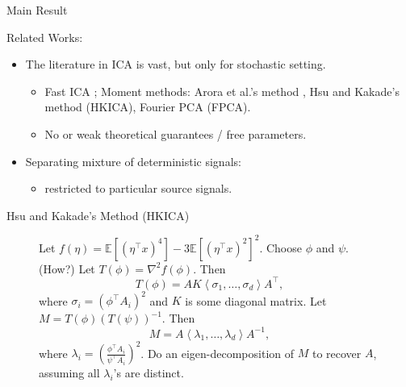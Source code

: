 \documentclass[final]{beamer} %
\newcommand{\EEp}[1]{\mathbb{E}\left[#1\right]}
\begin{document}
\begin{frame}[c]
\begin{columns}[t,totalwidth=\textwidth]
\begin{column}{.32\textwidth}
\begin{block}{Main Result}
\begin{center}
\begin{tcolorbox}[title = \vspace{0.4cm}\textbf{\large Main Result} \vspace{0.4cm}, title filled, width = 0.95\textwidth, colback = uofagreen!10, colframe = red]
				\end{tcolorbox}
			\end{center}
				{\large Related Works:}
			\begin{itemize}
						\item The literature in ICA is vast, but only for stochastic setting.
						\begin{itemize}
							\item Fast ICA \citep{hyvarinen1999fast}; Moment methods:
							Arora et al.'s method \citep{arora2012provable},
							Hsu and Kakade's method \citep{hsu2013learning} (HKICA), 
							Fourier PCA \citep{goyal2014fourier} (FPCA).	
							\item No or weak theoretical guarantees / free parameters.
						\end{itemize}
						\item Separating mixture of deterministic signals: \citet{kirimoto2011separation,forootan2013separation}
						\begin{itemize}
						\item restricted to particular source signals.
						\end{itemize}
					\end{itemize}
		\bigskip
		\end{block}
		\bigskip
			\begin{block}{Hsu and Kakade's Method (HKICA)}
				\begin{figure}
				\begin{algorithmic}[1]
					\STATE Let $f(\eta) = \EEp{(\eta^{\top}x)^4} - 3 \EEp{(\eta^{\top}x)^2}^2$.
					\STATE  Choose $\phi$ and $\psi$. (How?)
					\STATE Let $T(\phi) = \nabla^2 f(\phi)$. Then 
						\[T(\phi) = AK \left\langle \sigma_1,\ldots,  \sigma_d\right\rangle A^{\top},
						\]
						where $\sigma_i = \left(\phi^{\top}A_i\right)^2$ and $K$ is some diagonal matrix.
					\STATE Let $M = T(\phi)(T(\psi))^{-1}$. Then 
						\[M = A \left\langle \lambda_1, \ldots, \lambda_d \right\rangle A^{-1},
						\]
						where $\lambda_i = \left(\frac{\phi^{\top}A_i}{\psi^{\top}A_i}\right)^2$.
						\vspace{0.55cm}
					\STATE Do an eigen-decomposition of $M$ to recover $A$, assuming all $\lambda_i$'s are distinct.
				\end{algorithmic}
				\end{figure}

			\end{block}
	\end{column}


\end{columns}
\end{frame}
\end{document}

